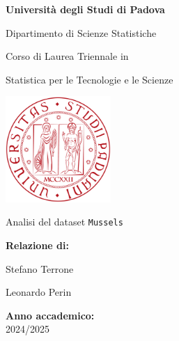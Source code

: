 \documentclass{article} %
\begin{document}


\begin{titlepage}
    \centering
    \vspace{1.5cm}
    {\huge \textbf{Università degli Studi di Padova} \par}
    {\LARGE Dipartimento di Scienze Statistiche \par}
    \vspace{0.5cm}

    {\Large Corso di Laurea Triennale in \par}
    {\Large Statistica per le Tecnologie e le Scienze \par}
    \vspace{1.5cm}

    \includegraphics[width=0.3\textwidth]{immagini/unipd.png} %
    \vspace{1.5cm}

    {\Huge Analisi del dataset \texttt{Mussels} \par}

    \vspace{3.5cm}
    \begin{flushright}
        {\Large \textbf{Relazione di:} \par}
        {\Large Stefano Terrone \par}
        {\Large Leonardo Perin \par}
        \vspace{2.5cm}
    \end{flushright}
        {\Large \textbf{Anno accademico:} \\2024/2025 \par}

\end{titlepage}
\end{document}
